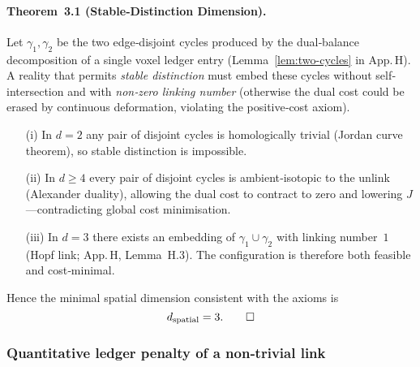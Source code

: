 \paragraph{Theorem 3.1 (Stable‐Distinction Dimension).}
Let $\gamma_{1},\gamma_{2}$ be the two edge‐disjoint cycles produced by the
dual‐balance decomposition of a single voxel ledger entry
(Lemma \ref{lem:two-cycles} in App.\,H).
A reality that permits \emph{stable distinction} must embed these cycles
without self‐intersection and with \emph{non‑zero linking number} 
(otherwise the dual cost could be erased by continuous deformation,
violating the positive‐cost axiom).

\begin{enumerate}
\item[(i)]  In $d=2$ any pair of disjoint cycles is homologically trivial
            (Jordan curve theorem), so stable distinction is impossible.
\item[(ii)] In $d\ge4$ every pair of disjoint cycles is ambient‑isotopic to
            the unlink (Alexander duality), allowing the dual cost to
            contract to zero and lowering $J$—contradicting global
            cost minimisation.
\item[(iii)] In $d=3$ there exists an embedding of $\gamma_{1}\!\cup\!\gamma_{2}$
             with linking number $1$ (Hopf link; App.\,H, Lemma H.3).
             The configuration is therefore both feasible and
             cost‑minimal.
\end{enumerate}
Hence the minimal spatial dimension consistent with the axioms is
\[
  d_{\text{spatial}}=3. \qedhere
\]

\subsubsection*{Quantitative ledger penalty of a non‑trivial link}

